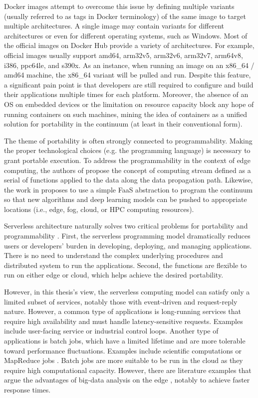 Docker images attempt to overcome this issue by defining multiple variants (usually referred to as tags in Docker terminology) of the same image to target multiple architectures. A single image may contain variants for different architectures or even for different operating systems, such as Windows. Most of the official images on Docker Hub \cite{docker-hub} provide a variety of architectures. For example, official images usually support amd64, arm32v5, arm32v6, arm32v7, arm64v8, i386, ppc64le, and s390x. As an instance, when running an image on an x86\_64 / amd64 machine, the x86\_64 variant will be pulled and run. Despite this feature, a significant pain point is that developers are still required to configure and build their applications multiple times for each platform. Moreover, the absence of an OS on embedded devices or the limitation on resource capacity block any hope of running containers on such machines, mining the idea of containers as a unified solution for portability in the continuum (at least in their conventional form).

The theme of portability is often strongly connected to programmability. Making the proper technological choices (e.g. the programming language) is necessary to grant portable execution. To address the programmability in the context of edge computing, the authors of \cite{shi2016edge} propose the concept of computing stream defined as a serial of functions applied to the data along the data propagation path. Likewise, the work in \cite{beckman2020harnessing} proposes to use a simple FaaS abstraction to program the continuum so that new algorithms and deep learning models can be pushed to appropriate locations (i.e., edge, fog, cloud, or HPC computing resources).

Serverless architecture naturally solves two critical problems for portability and programmability \cite{yi2017lavea}. First, the serverless programming model dramatically reduces users or developers' burden in developing, deploying, and managing applications. There is no need to understand the complex underlying procedures and distributed system to run the applications. Second, the functions are flexible to run on either edge or cloud, which helps achieve the desired portability.

However, in this thesis's view, the serverless computing model can satisfy only a limited subset of services, notably those with event-driven and request-reply nature. However, a common type of applications is long-running services that require high availability and must handle latency-sensitive requests. Examples include user-facing service or industrial control loops. Another type of applications is batch jobs, which have a limited lifetime and are more tolerable toward performance fluctuations. Examples include scientific computations or MapReduce jobs \cite{condie2010mapreduce}. Batch jobs are more suitable to be run in the cloud as they require high computational capacity. However, there are literature examples that argue the advantages of big-data analysis on the edge \cite{he2017multitier}, notably to achieve faster response times.

